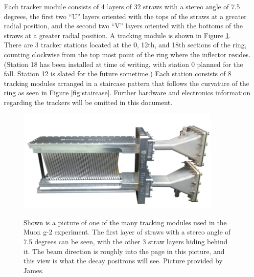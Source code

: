 \documentclass{article}
\begin{document}
  Each tracker module consists of 4 layers of 32 straws with a stereo angle of 7.5 degrees, the first two ``U'' layers oriented with the tops of the straws at a greater radial position, and the second two ``V'' layers oriented with the bottoms of the straws at a greater radial position. A tracking module is shown in Figure \ref{fig:tracker}. There are 3 tracker stations located at the 0, 12th, and 18th sections of the ring, counting clockwise from the top most point of the ring where the inflector resides. (Station 18 has been installed at time of writing, with station 0 planned for the fall. Station 12 is slated for the future sometime.) Each station consists of 8 tracking modules arranged in a staircase pattern that follows the curvature of the ring as seen in Figure \ref{fig:staircase}. Further hardware and electronics information regarding the trackers will be omitted in this document.

\begin{figure}[]
\caption{Shown is a picture of one of the many tracking modules used in the Muon g-2 experiment. The first layer of straws with a stereo angle of 7.5 degrees can be seen, with the other 3 straw layers hiding behind it. The beam direction is roughly into the page in this picture, and this view is what the decay positrons will see. Picture provided by James.}
\centering
\includegraphics[width=0.9\textwidth]{Tracker}
\label{fig:tracker}
\end{figure}
\end{document}
